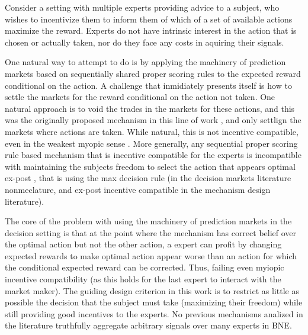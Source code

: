 
Consider a setting with multiple experts providing advice to a subject, who wishes to incentivize them to inform them of which of a set of available actions maximize the reward.
Experts do not have intrinsic interest in the action that is chosen or actually taken, nor do they face any costs in aquiring their signals.

One natural way to attempt to do is by applying the machinery of prediction markets based on sequentially shared proper scoring rules to the expected reward conditional on the action. 
A challenge that inmidiately presents itself is how to settle the markets for the reward conditional on the action not taken.
One natural approach is to void the trades in the markets for these actions, and this was the originally proposed mechanism in this line of work \cite{hanson2002decision}, and only settlign the markets where actions are taken.
While natural, this is not incentive compatible, even in the weakest myopic sense \cite{othman2010decision}. 
More generally, any sequential proper scoring rule based mechanism that is incentive compatible for the experts is incompatible with maintaining the subjects freedom to select the action that appears optimal ex-post \cite{othman2010decision,  chen2014eliciting}, that is using the max decision rule (in the decision markets literature nonmeclature, and ex-post incentive compatible in the mechanism design literature). 

The core of the problem with using the machinery of prediction markets in the decision setting is that at the point where the mechanism has correct belief over the optimal action but not the other action, a expert  can profit by changing expected rewards to make optimal action appear worse than an action for which the conditional expected reward can be corrected. Thus, failing even myiopic incentive compatibility (as this holds for the last expert to interact with the market maker).
The guiding design criterion in this work is to restrict as little as possible the decision that the subject must take (maximizing their freedom) while still providing good incentives to the experts. No previous mechanisms analized in the literature truthfully aggregate arbitrary signals over many experts in BNE. 

